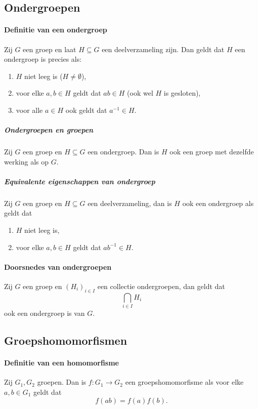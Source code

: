 \subsection{Ondergroepen}
\paragraph{Definitie van een ondergroep} Zij \(G\) een groep en laat \(H\subseteq G\) een deelverzameling zijn. Dan geldt dat \(H\) een ondergroep is precies als:
\begin{enumerate}
    \item \(H\) niet leeg is (\(H\neq\emptyset\)),
    \item voor elke \(a,b\in H\) geldt dat \(ab\in H\) (ook wel \(H\) is gesloten),
    \item voor alle \(a\in H\) ook geldt dat \(a^{-1}\in H\).
\end{enumerate}

\subparagraph{Ondergroepen en groepen} Zij \(G\) een groep en \(H\subseteq G\) een ondergroep. Dan is \(H\) ook een groep met dezelfde werking als op \(G\).

\subparagraph{Equivalente eigenschappen van ondergroep} Zij \(G\) een groep en \(H\subseteq G\) een deelverzameling, dan is \(H\) ook een ondergroep als geldt dat
\begin{enumerate}
    \item \(H\) niet leeg is,
    \item voor elke \(a,b\in H\) geldt dat \(ab^{-1}\in H\).
\end{enumerate}

\paragraph{Doorsnedes van ondergroepen} Zij \(G\) een groep en \((H_{i})_{i\in I}\) een collectie ondergroepen, dan geldt dat
\[
    \bigcap_{i\in I}H_{i}
\]
ook een ondergroep is van \(G\).

\subsection{Groepshomomorfismen}
\paragraph{Definitie van een homomorfisme} Zij \(G_{1},G_{2}\) groepen. Dan is \(f\colon G_{1}\to G_{2}\) een groepshomomorfisme als voor elke \(a,b\in G_{1}\) geldt dat
\[
    f(ab)=f(a)f(b).
\]

